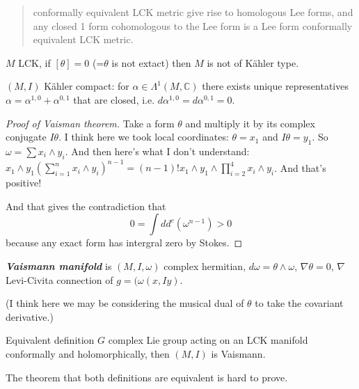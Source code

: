 \begin{quotation}
	conformally equivalent LCK metric give rise to homologous Lee forms, and any closed 1 form cohomologous to the Lee form is a Lee form conformally equivalent LCK metric.
\end{quotation}

\begin{thm}[Vaisman]\leavevmode
	\(M\) LCK, if \([\theta]=0\) (=\(\theta\) is not extact) then \(M\) is not of Kähler type. 
\end{thm}

\begin{remark}\leavevmode
\((M,I)\) Kähler compact: for \(\alpha \in \Lambda^{1}(M,\mathbb{C})\) there exists unique representatives \(\alpha=\alpha^{1,0}+\alpha^{0,1}\) that are closed, i.e.  \(d \alpha^{1,0}=d \alpha^{0,1}=0\).
\end{remark}

\begin{proof}[Proof of Vaisman theorem]\leavevmode
Take a form \(\theta\) and multiply it by its complex conjugate \(I \theta\). I think here we took local coordinates: \(\theta=x_1\) and \(I\theta=y_1\). So \(\omega = \sum x_i \wedge y_i\). And then here's what I don't understand:
\(x_1 \wedge y_1 \left(\sum_{i=1}^n x_i \wedge y_i\right)^{n-1}=(n-1)! x_1 \wedge y_1 \wedge \prod_{i=2}^4 x_i \wedge y_i\). And that's positive!

And that gives the contradiction that
\[0= \int d d^c (\omega^{n-1})>0\]
because any exact form has intergral zero by Stokes.
\end{proof}

\begin{defn}\leavevmode
\textit{\textbf{Vaismann manifold}} is \((M,I,\omega)\) complex hermitian, \(d\omega =\theta \wedge \omega\), \(\nabla\theta=0\), \(\nabla\) Levi-Civita connection of \(g=(\omega(x,Iy)\).

{\color{7}(I think here we may be considering the musical dual of \(\theta\) to take the covariant derivative.)}
\end{defn}

\begin{thing6}{Equivalent definition}\leavevmode
\(G \) complex Lie group acting on an LCK manifold conformally and holomorphically, then  \((M,I)\) is Vaismann.
\end{thing6}

\begin{remark}\leavevmode
The theorem that both definitions are equivalent is hard to prove.
\end{remark}

